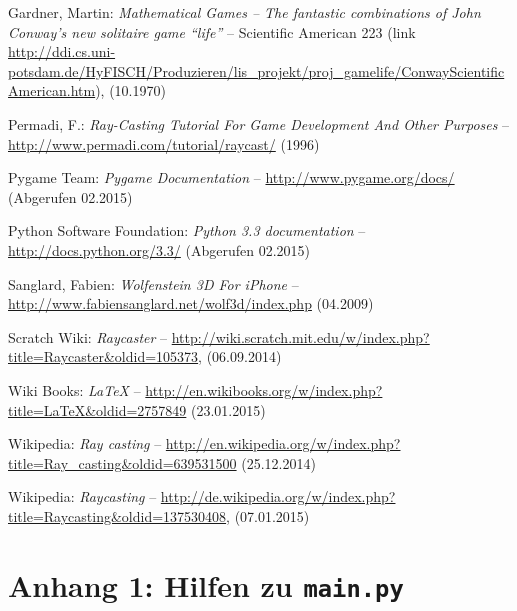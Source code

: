 \documentclass[a4paper,12pt]{report}
\begin{document}
\begin{thebibliography}{9}

  Gardner, Martin:
  \emph{ Mathematical Games – The fantastic combinations of John Conway's new solitaire game ``life''} --
  Scientific American 223 (link \url{http://ddi.cs.uni-potsdam.de/HyFISCH/Produzieren/lis_projekt/proj_gamelife/ConwayScientificAmerican.htm}),
  (10.1970)

  Permadi, F.:
  \emph{Ray-Casting Tutorial For Game Development And Other Purposes} --
  \url{http://www.permadi.com/tutorial/raycast/}
  (1996)

  Pygame Team:
  \emph{Pygame Documentation} --
  \url{http://www.pygame.org/docs/}
  (Abgerufen 02.2015)

  Python Software Foundation:
  \emph{Python 3.3 documentation} --
  \url{http://docs.python.org/3.3/}
  (Abgerufen 02.2015)

  Sanglard, Fabien:
  \emph{Wolfenstein 3D For iPhone} -- 
  \url{http://www.fabiensanglard.net/wolf3d/index.php}
  (04.2009)

  Scratch Wiki:
  \emph{Raycaster} --
  \url{http://wiki.scratch.mit.edu/w/index.php?title=Raycaster&oldid=105373},
  (06.09.2014)

  Wiki Books:
  \emph{\LaTeX} --
  \url{http://en.wikibooks.org/w/index.php?title=LaTeX&oldid=2757849}
  (23.01.2015)

  Wikipedia:
  \emph{Ray casting} -- 
  \url{http://en.wikipedia.org/w/index.php?title=Ray_casting&oldid=639531500}
  (25.12.2014)

  Wikipedia:
  \emph{Raycasting} --
  \url{http://de.wikipedia.org/w/index.php?title=Raycasting&oldid=137530408},
  (07.01.2015)

\end{thebibliography}

\appendix

\chapter{Anhang 1: Hilfen zu \texttt{main.py}}
\end{document}
